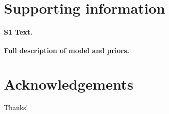 \documentclass[10pt,letterpaper]{article}
\begin{document}
\section*{Supporting information}

\paragraph*{S1 Text.}
\label{S1_Diag}
{\bf Full description of model and priors.}

\section*{Acknowledgements}

Thanks!

\nolinenumbers

%
%
% 



\end{document}
